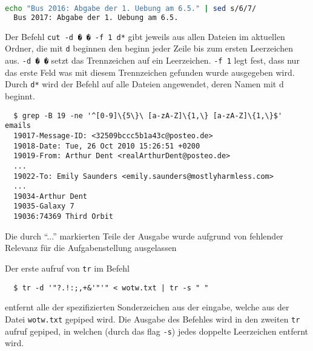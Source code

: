 \documentclass[a4paper,twoside,subproblemsty=arabic,subsubproblemsty=alph, listings]{homeworkassignment}
\begin{document}
\newsubproblem[2]
\newsubsubproblem
\begin{lstlisting}[language=bash]
   echo "Bus 2016: Abgabe der 1. Uebung am 6.5." | sed s/6/7/
  Bus 2017: Abgabe der 1. Uebung am 6.5.
\end{lstlisting}

\newsubsubproblem
Der Befehl \texttt{cut -d � � -f 1 d*} gibt jeweils aus allen
Dateien im aktuellen Ordner, die mit \texttt{d} beginnen den beginn
jeder Zeile bis zum ersten Leerzeichen aus. \texttt{-d � �} setzt das
Trennzeichen auf ein Leerzeichen. \texttt{-f 1} legt fest, dass nur
das erste Feld was mit diesem Trennzeichen gefunden wurde ausgegeben
wird. Durch \texttt{d*} wird der Befehl auf alle Dateien angewendet,
deren Namen mit d beginnt.

\newsubsubproblem
\begin{lstlisting}
  $ grep -B 19 -ne '^[0-9]\{5\}\ [a-zA-Z]\{1,\} [a-zA-Z]\{1,\}$' emails
  19017-Message-ID: <32509bccc5b1a43c@posteo.de>
  19018-Date: Tue, 26 Oct 2010 15:26:51 +0200
  19019-From: Arthur Dent <realArthurDent@posteo.de>
  ...
  19022-To: Emily Saunders <emily.saunders@mostlyharmless.com>
  ...
  19034-Arthur Dent
  19035-Galaxy 7
  19036:74369 Third Orbit
\end{lstlisting}
Die durch ``...'' markierten Teile der Ausgabe wurde aufgrund
von fehlender Relevanz f\"ur die Aufgabenstellung ausgelassen



\newsubproblem[3] %
\newsubsubproblem

Der erste aufruf von \texttt{tr} im Befehl
\begin{lstlisting}
  $ tr -d '"?.!:;,+&'"'" < wotw.txt | tr -s " "
\end{lstlisting}%
entfernt alle der spezifizierten Sonderzeichen aus der eingabe, welche
aus der Datei \texttt{wotw.txt} gepiped wird. Die Ausgabe des Befehles
wird in den zweiten \texttt{tr} aufruf gepiped, in welchen (durch das
flag \texttt{-s}) jedes doppelte Leerzeichen entfernt wird.
%
\end{document}
